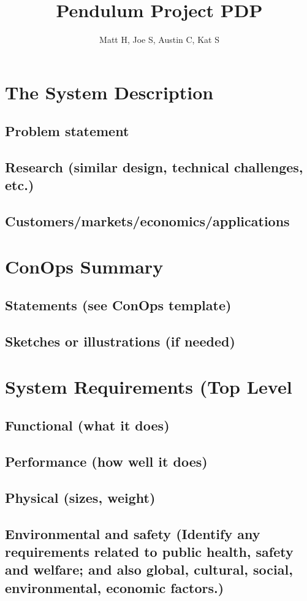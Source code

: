 \documentclass[a4paper,10pt]{article}
\title{Pendulum Project PDP}
\author{Matt H, Joe S, Austin C, Kat S}
\begin{document}
\maketitle

\tableofcontents


\section{The System Description}
    \subsection{Problem statement}
    \subsection{Research (similar design, technical challenges, etc.)}
    \subsection{Customers/markets/economics/applications}
\section{ConOps Summary}
    \subsection{Statements (see ConOps template)}
    \subsection{Sketches or illustrations (if needed)}
\section{System Requirements (Top Level}
    \subsection{Functional (what it does)}
    \subsection{Performance (how well it does)}
    \subsection{Physical (sizes, weight)}
    \subsection{Environmental and safety (Identify any requirements related to public health, safety and welfare; and also global, cultural, social, environmental, economic factors.)}
\end{document}
